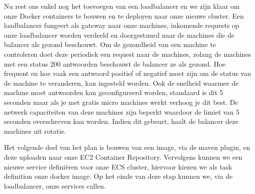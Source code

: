 	\par
	Nu rest ons enkel nog het toevoegen van een loadbalancer en we zijn klaar om onze Docker containers te bouwen en te deployen naar onze nieuwe cluster. Een loadbalancer fungeert als gateway naar onze machines, inkomende requests op onze loadbalancer worden verdeeld en doorgestuurd naar de machines die de balancer als gezond beschouwt. Om de gezondheid van een machine te controleren doet deze periodiek een request naar de machines, zolang de machines met een status 200 antwoorden beschouwt de balancer ze als gezond. Hoe frequent en hoe vaak een antwoord positief of negatief moet zijn om de status van de machine te veranderen, kan ingesteld worden. Ook de snelheid waarmee de machine moet antwoorden kan geconfigureerd worden, standaard is dit 5 seconden maar als je met gratis micro machines werkt verhoog je dit best. De netwerk capaciteiten van deze machines zijn beperkt waardoor de limiet van 5 seconden overschreven kan worden. Indien dit gebeurt, haalt de balancer deze machines uit rotatie.
	\par
	Het volgende deel van het plan is bouwen van een image, via de maven plugin, en deze uploaden naar onze EC2 Container Repository. Vervolgens kunnen we een nieuwe service defini\"eren voor onze ECS cluster, hiervoor kiezen we als task definition onze docker image. Op het einde van deze stap kunnen we, via de loadbalancer, onze services callen.



